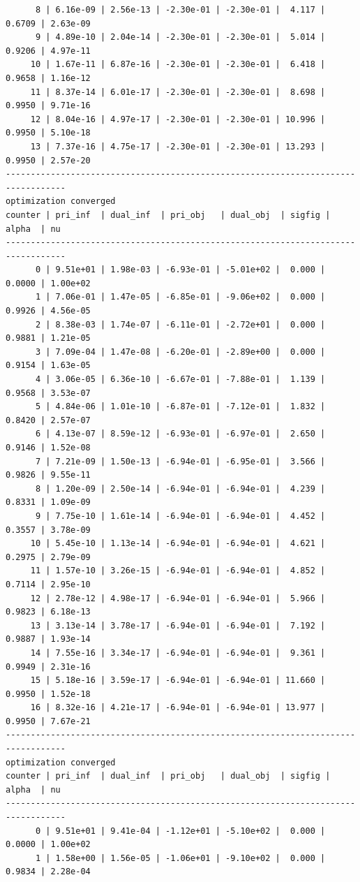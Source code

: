 \documentclass[
]{book}
\begin{document}
\begin{verbatim}
      8 | 6.16e-09 | 2.56e-13 | -2.30e-01 | -2.30e-01 |  4.117 | 0.6709 | 2.63e-09
      9 | 4.89e-10 | 2.04e-14 | -2.30e-01 | -2.30e-01 |  5.014 | 0.9206 | 4.97e-11
     10 | 1.67e-11 | 6.87e-16 | -2.30e-01 | -2.30e-01 |  6.418 | 0.9658 | 1.16e-12
     11 | 8.37e-14 | 6.01e-17 | -2.30e-01 | -2.30e-01 |  8.698 | 0.9950 | 9.71e-16
     12 | 8.04e-16 | 4.97e-17 | -2.30e-01 | -2.30e-01 | 10.996 | 0.9950 | 5.10e-18
     13 | 7.37e-16 | 4.75e-17 | -2.30e-01 | -2.30e-01 | 13.293 | 0.9950 | 2.57e-20
----------------------------------------------------------------------------------
optimization converged
counter | pri_inf  | dual_inf  | pri_obj   | dual_obj  | sigfig | alpha  | nu 
----------------------------------------------------------------------------------
      0 | 9.51e+01 | 1.98e-03 | -6.93e-01 | -5.01e+02 |  0.000 | 0.0000 | 1.00e+02
      1 | 7.06e-01 | 1.47e-05 | -6.85e-01 | -9.06e+02 |  0.000 | 0.9926 | 4.56e-05
      2 | 8.38e-03 | 1.74e-07 | -6.11e-01 | -2.72e+01 |  0.000 | 0.9881 | 1.21e-05
      3 | 7.09e-04 | 1.47e-08 | -6.20e-01 | -2.89e+00 |  0.000 | 0.9154 | 1.63e-05
      4 | 3.06e-05 | 6.36e-10 | -6.67e-01 | -7.88e-01 |  1.139 | 0.9568 | 3.53e-07
      5 | 4.84e-06 | 1.01e-10 | -6.87e-01 | -7.12e-01 |  1.832 | 0.8420 | 2.57e-07
      6 | 4.13e-07 | 8.59e-12 | -6.93e-01 | -6.97e-01 |  2.650 | 0.9146 | 1.52e-08
      7 | 7.21e-09 | 1.50e-13 | -6.94e-01 | -6.95e-01 |  3.566 | 0.9826 | 9.55e-11
      8 | 1.20e-09 | 2.50e-14 | -6.94e-01 | -6.94e-01 |  4.239 | 0.8331 | 1.09e-09
      9 | 7.75e-10 | 1.61e-14 | -6.94e-01 | -6.94e-01 |  4.452 | 0.3557 | 3.78e-09
     10 | 5.45e-10 | 1.13e-14 | -6.94e-01 | -6.94e-01 |  4.621 | 0.2975 | 2.79e-09
     11 | 1.57e-10 | 3.26e-15 | -6.94e-01 | -6.94e-01 |  4.852 | 0.7114 | 2.95e-10
     12 | 2.78e-12 | 4.98e-17 | -6.94e-01 | -6.94e-01 |  5.966 | 0.9823 | 6.18e-13
     13 | 3.13e-14 | 3.78e-17 | -6.94e-01 | -6.94e-01 |  7.192 | 0.9887 | 1.93e-14
     14 | 7.55e-16 | 3.34e-17 | -6.94e-01 | -6.94e-01 |  9.361 | 0.9949 | 2.31e-16
     15 | 5.18e-16 | 3.59e-17 | -6.94e-01 | -6.94e-01 | 11.660 | 0.9950 | 1.52e-18
     16 | 8.32e-16 | 4.21e-17 | -6.94e-01 | -6.94e-01 | 13.977 | 0.9950 | 7.67e-21
----------------------------------------------------------------------------------
optimization converged
counter | pri_inf  | dual_inf  | pri_obj   | dual_obj  | sigfig | alpha  | nu 
----------------------------------------------------------------------------------
      0 | 9.51e+01 | 9.41e-04 | -1.12e+01 | -5.10e+02 |  0.000 | 0.0000 | 1.00e+02
      1 | 1.58e+00 | 1.56e-05 | -1.06e+01 | -9.10e+02 |  0.000 | 0.9834 | 2.28e-04

\end{verbatim}
\end{document}
